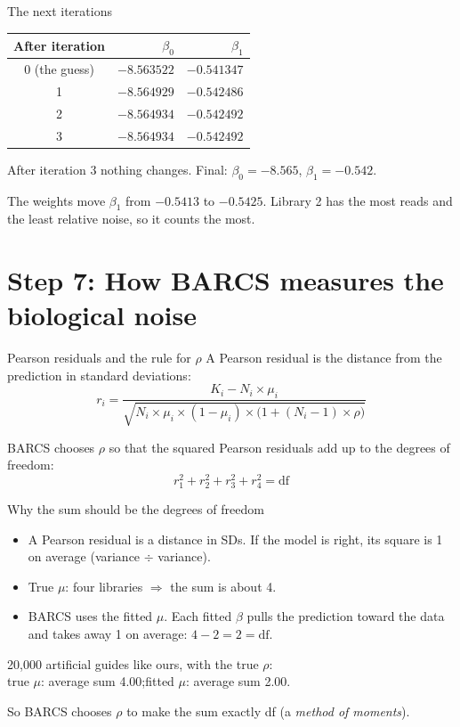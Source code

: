 \documentclass[aspectratio=169,11pt]{beamer}
\begin{document}
\begin{frame}{The next iterations}
\begin{center}
\begin{tabular}{crr}
\toprule
After iteration & $\beta_0$ & $\beta_1$\\
\midrule
0 (the guess) & $-8.563522$ & $-0.541347$\\
1 & $-8.564929$ & $-0.542486$\\
2 & $-8.564934$ & $-0.542492$\\
3 & $-8.564934$ & $-0.542492$\\
\bottomrule
\end{tabular}
\end{center}
After iteration 3 nothing changes. Final: $\beta_0 = -8.565$,
$\beta_1 = -0.542$.
\medskip
\begin{remember}
The weights move $\beta_1$ from $-0.5413$ to $-0.5425$. Library 2 has the
most reads and the least relative noise, so it counts the most.
\end{remember}
\end{frame}

\section{Step 7: How BARCS measures the biological noise}

\begin{frame}{Pearson residuals and the rule for \texorpdfstring{$\rho$}{rho}}
A \alert{Pearson residual} is the distance from the prediction in standard
deviations:
\[
r_i = \frac{K_i - N_i \times \mu_i}{\sqrt{N_i \times \mu_i \times (1-\mu_i) \times \bigl(1 + (N_i-1) \times \rho\bigr)}}
\]
\begin{remember}
BARCS chooses $\rho$ so that the squared Pearson residuals add up to the
degrees of freedom:
\[
r_1^2 + r_2^2 + r_3^2 + r_4^2 = \text{df}
\]
\end{remember}
\end{frame}

\begin{frame}{Why the sum should be the degrees of freedom}
\begin{itemize}
\item A Pearson residual is a distance in SDs. If the model is right, its
  square is 1 on average (variance $\div$ variance).
\item True $\mu$: four libraries $\Rightarrow$ the sum is about 4.
\item BARCS uses the fitted $\mu$. Each fitted $\beta$ pulls the
  prediction toward the data and takes away 1 on average:
  $4 - 2 = 2 = \text{df}$.
\end{itemize}
\begin{worked}
20{,}000 artificial guides like ours, with the true $\rho$:\\
true $\mu$: average sum 4.00;\quad fitted $\mu$: average sum 2.00.
\end{worked}
{\small So BARCS chooses $\rho$ to make the sum exactly df (a \emph{method of
moments}).}
\end{frame}
\end{document}

